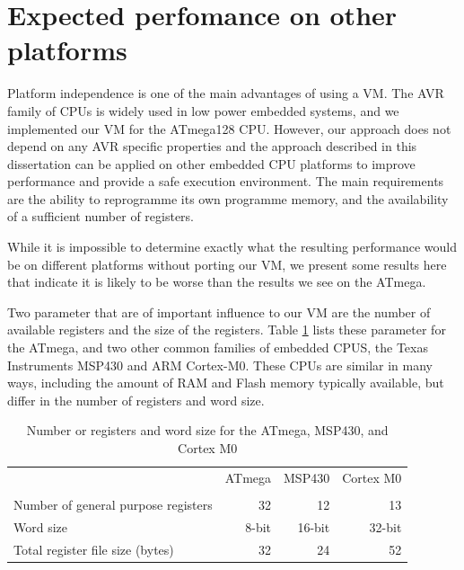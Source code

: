 \section{Expected perfomance on other platforms}
\label{sec-evaluation-other-platforms}
Platform independence is one of the main advantages of using a VM. The AVR family of CPUs is widely used in low power embedded systems, and we implemented our VM for the ATmega128 CPU. However, our approach does not depend on any AVR specific properties and the approach described in this dissertation can be applied on other embedded CPU platforms to improve performance and provide a safe execution environment. The main requirements are the ability to reprogramme its own programme memory, and the availability of a sufficient number of registers.

While it is impossible to determine exactly what the resulting performance would be on different platforms without porting our VM, we present some results here that indicate it is likely to be worse than the results we see on the ATmega.

Two parameter that are of important influence to our VM are the number of available registers and the size of the registers. Table \ref{tbl-ATmega-msp430-m0-registers} lists these parameter for the ATmega, and two other common families of embedded CPUS, the Texas Instruments MSP430 and ARM Cortex-M0. These CPUs are similar in many ways, including the amount of RAM and Flash memory typically available, but differ in the number of registers and word size.

\begin{table}
\caption{Number or registers and word size for the ATmega, MSP430, and Cortex M0}
\label{tbl-ATmega-msp430-m0-registers}
    \begin{tabular}{lrrr}
    \toprule
                                           & ATmega       & MSP430     & Cortex M0 \\
                                           & \cite{Atmel:ATmega128Datasheet, Atmel:AVRInstructionSetManual}
                                           & \cite{TexasInstrumentsIncorporated:MSP430F1611Datasheet, TexasInstrumentsIncorporated:MSP430x1xxUsersGuide}
                                           & \cite{ARM:2009vz} \\
    \midrule
    \midrule
    Number of general purpose registers    & 32           & 12         & 13        \\
    Word size                              & 8-bit        & 16-bit     & 32-bit    \\
    Total register file size (bytes)       & 32           & 24         & 52        \\
    \bottomrule
    \end{tabular}
\end{table}

